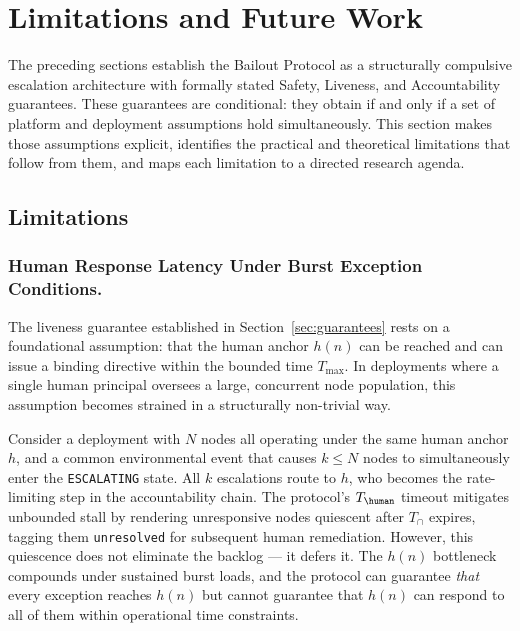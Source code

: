 \section{Limitations and Future Work}
\label{sec:limitations}

The preceding sections establish the Bailout Protocol as a structurally compulsive escalation architecture with formally stated Safety, Liveness, and Accountability guarantees. These guarantees are conditional: they obtain if and only if a set of platform and deployment assumptions hold simultaneously. This section makes those assumptions explicit, identifies the practical and theoretical limitations that follow from them, and maps each limitation to a directed research agenda.

\subsection{Limitations}
\label{sec:limitations-subsection}

\subsubsection{Human Response Latency Under Burst Exception Conditions.}

The liveness guarantee established in Section~\ref{sec:guarantees} rests on a foundational assumption: that the human anchor $h(n)$ can be reached and can issue a binding directive within the bounded time $T_{\max}$. In deployments where a single human principal oversees a large, concurrent node population, this assumption becomes strained in a structurally non-trivial way.

Consider a deployment with $N$ nodes all operating under the same human anchor $h$, and a common environmental event that causes $k \leq N$ nodes to simultaneously enter the \texttt{ESCALATING} state. All $k$ escalations route to $h$, who becomes the rate-limiting step in the accountability chain. The protocol's $T_{\human}$ timeout mitigates unbounded stall by rendering unresponsive nodes quiescent after $T_{\cap}$ expires, tagging them \texttt{unresolved} for subsequent human remediation. However, this quiescence does not eliminate the backlog --- it defers it. The $h(n)$ bottleneck compounds under sustained burst loads, and the protocol can guarantee \emph{that} every exception reaches $h(n)$ but cannot guarantee that $h(n)$ can respond to all of them within operational time constraints.

